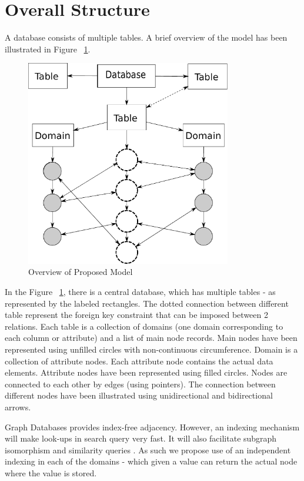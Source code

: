 \documentclass[12pt, oneside]{book}
\begin{document}
\section{Overall Structure}
A database consists of multiple tables. A brief overview of the model has been illustrated in Figure ~\ref{fig:overview}. \\
\begin{figure}[t]
 \centering
 \includegraphics[width=0.8\textwidth]{pics/model.pdf}
 \caption{Overview of Proposed Model}
 \label{fig:overview}
\end{figure}
In the Figure ~\ref{fig:overview}, there is a central database, which has multiple tables - as represented by the labeled rectangles. The dotted connection between different table represent the foreign key constraint that can be imposed between 2 relations. Each table is a collection of domains (one domain corresponding to each column or attribute) and a list of main node records. Main nodes have been represented using unfilled circles with non-continuous circumference. Domain is a collection of attribute nodes. Each attribute node contains the actual data elements. Attribute nodes have been represented using filled circles. Nodes are connected to each other by edges (using pointers). The connection between different nodes have been illustrated using unidirectional and bidirectional arrows. \\ \par
Graph Databases provides index-free adjacency. However, an indexing mechanism will make look-ups in search query very fast. It will also facilitate subgraph isomorphism and similarity queries \cite{indexing}. As such we propose use of an independent indexing in each of the domains - which given a value can return the actual node where the value is stored.
\end{document}
